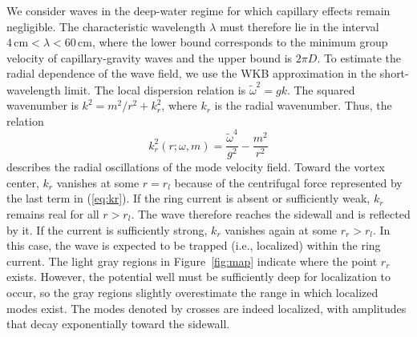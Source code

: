 \documentclass[aps,twocolumn]{revtex4-2}
\begin{document}
We consider waves in the deep-water regime for which capillary effects remain negligible. The characteristic wavelength $\lambda$ must therefore lie in the interval $4\,\text{cm} < \lambda < 60\,\text{cm}$, where the lower bound corresponds to the minimum group velocity of capillary-gravity waves and the upper bound is $2\pi D$. To estimate the radial dependence of the wave field, we use the WKB approximation in the short-wavelength limit. The local dispersion relation is $\widetilde \omega^2  = gk$. The squared wavenumber is $k^2 = m^2/r^2 + k_r^2$, where $k_r$ is the radial wavenumber. Thus, the relation
\begin{equation}\label{eq:kr}
	k_r^2 (r;\omega,m)
	=
	\frac{\widetilde\omega^4}{g^2} - \frac{m^2}{r^2}
\end{equation}
describes the radial oscillations of the mode velocity field. Toward the vortex center, $k_r$ vanishes at some $r=r_l$ because of the centrifugal force represented by the last term in (\ref{eq:kr}). If the ring current is absent or sufficiently weak, $k_r$ remains real for all $r>r_l$. The wave therefore reaches the sidewall and is reflected by it. If the current is sufficiently strong, $k_r$ vanishes again at some $r_r > r_l$. In this case, the wave is expected to be trapped (i.e., localized) within the ring current. The light gray regions in Figure~\ref{fig:map} indicate where the point $r_r$ exists. However, the potential well must be sufficiently deep for localization to occur, so the gray regions slightly overestimate the range in which localized modes exist. The modes denoted by crosses are indeed localized, with amplitudes that decay exponentially toward the sidewall.
\end{document}
